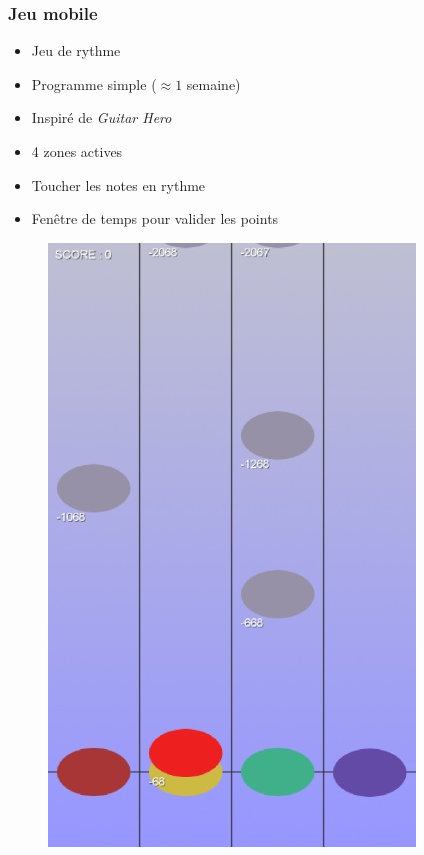 \begin{frame}
\frametitle{Jeu mobile}
\begin{multicols}{2} 
\begin{itemize}
\item Jeu de rythme
\item Programme simple ($\approx 1$ semaine)
\item Inspiré de \textit{Guitar Hero}
\item 4 zones actives
\item Toucher les notes en rythme
\item Fenêtre de temps pour valider les points
\end{itemize} 
\columnbreak 
\begin{figure}
\includegraphics[scale=0.4]{images/jeu3.jpg}
\end{figure}
\end{multicols}
\end{frame}

